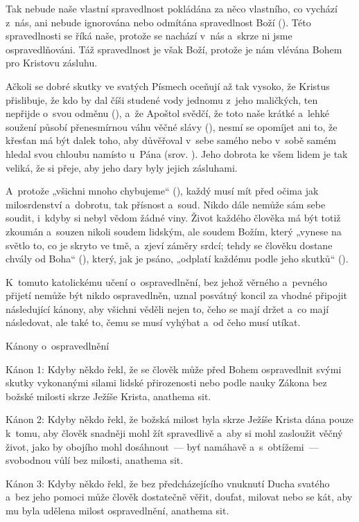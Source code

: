 Tak nebude naše vlastní spravedlnost pokládána za něco vlastního, co vychází z~nás,
ani nebude ignorována nebo odmítána spravedlnost Boží (). Této spravedlnosti
se říká naše, protože se nachází v~nás a~skrze ni jsme ospravedlňováni. Táž spravedlnost
je však Boží, protože je nám vlévána Bohem pro Kristovu zásluhu.

Ačkoli se dobré skutky ve svatých Písmech oceňují až tak vysoko, že Kristus přislibuje,
že kdo by dal číši studené vody jednomu z~jeho maličkých, ten nepřijde o~svou odměnu
(), a~že Apoštol svědčí, že toto naše krátké a~lehké soužení působí přenesmírnou
váhu věčné slávy (), nesmí se opomíjet ani to, že křesťan má být dalek
toho, aby důvěřoval v~sebe samého nebo v~sobě samém hledal svou chloubu namísto u~Pána
(srov. ). Jeho dobrota ke všem lidem je tak veliká, že si
přeje, aby jeho dary byly jejich zásluhami.

A~protože „všichni mnoho chybujeme“ (), každý musí mít před očima jak milosrdenství
a~dobrotu, tak přísnost a~soud. Nikdo dále nemůže sám sebe soudit, i~kdyby si nebyl
vědom žádné viny. Život každého člověka má být totiž zkoumán a~souzen nikoli soudem
lidským, ale soudem Božím, který „vynese na světlo to, co je skryto ve tmě, a~zjeví
záměry srdcí; tehdy se člověku dostane chvály od Boha“ (), který, jak
je psáno, „odplatí každému podle jeho skutků“ ().

K~tomuto katolickému učení o~ospravedlnění, bez jehož věrného a~pevného přijetí nemůže
být nikdo ospravedlněn, uznal posvátný koncil za vhodné připojit následující kánony,
aby všichni věděli nejen to, čeho se mají držet a~co mají následovat, ale také to,
čemu se musí vyhýbat a~od čeho musí utíkat.



\canonMainTitle Kánony o~ospravedlnění

\canon
Kánon 1: Kdyby někdo řekl, že se člověk může před Bohem ospravedlnit svými skutky
vykonanými silami lidské přirozenosti nebo podle nauky Zákona bez božské milosti
skrze Ježíše Krista, anathema sit.

\canon
Kánon 2: Kdyby někdo řekl, že božská milost byla skrze Ježíše Krista dána pouze k~tomu,
aby člověk snadněji mohl žít spravedlivě a~aby si mohl zasloužit věčný život, jako
by obojího mohl dosáhnout~— byť namáhavě a~s~obtížemi~— svobodnou vůlí bez milosti,
anathema sit.

\canon
Kánon 3: Kdyby někdo řekl, že bez předcházejícího vnuknutí Ducha svatého a~bez jeho
pomoci může člověk dostatečně věřit, doufat, milovat nebo se kát, aby mu byla udělena
milost ospravedlnění, anathema sit.


